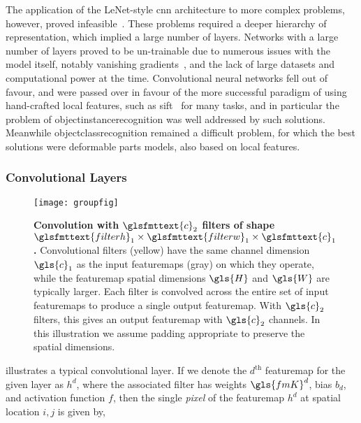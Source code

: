 \documentclass[thesis]{subfiles}
\begin{document}
The application of the LeNet-style \gls{cnn} architecture to more complex problems, however, proved infeasible~\citep{goodfellow2016deep}. These problems required a deeper hierarchy of representation, which implied a large number of layers. Networks with a large number of layers proved to be un-trainable due to numerous issues with the model itself, notably vanishing gradients~\citep{hochreiter1991untersuchungen}, and the lack of large datasets and computational power at the time. Convolutional neural networks fell out of favour, and were passed over in favour of the more successful paradigm of using hand-crafted local features, such as \gls{sift}~\citep{Lowe2004} for many tasks, and in particular the problem of \gls{objectinstancerecognition} was well addressed by such solutions. Meanwhile \gls{objectclassrecognition} remained a difficult problem, for which the best solutions were deformable parts models, also based on local features.

\subsubsection{Convolutional Layers}
\begin{figure}[tb]
	\centering
	\texttt{[image: groupfig]}
	\caption[Illustration of convolutional layer]{\textbf{Convolution with $\glsfmttext{c}_2$ filters of shape $\glsfmttext{filterh}_1\times \glsfmttext{filterw}_1\times \glsfmttext{c}_1$.} Convolutional filters (yellow) have the same channel dimension $\gls{c}_1$ as the input \glspl{featuremap} (gray) on which they operate, while the \gls{featuremap} spatial dimensions $\gls{H}$ and $\gls{W}$ are typically larger. Each filter is convolved across the entire set of input \glspl{featuremap} to produce a single output \gls{featuremap}. With $\gls{c}_2$ filters, this gives an output \gls{featuremap} with $\gls{c}_2$ channels. In this illustration we assume padding appropriate to preserve the spatial dimensions.}\label{fig:convlayer}
\end{figure}
%
 illustrates a typical convolutional layer. If we denote the $d^{\text{th}}$ \gls{featuremap} for the given layer as $h^d$, where the associated filter has weights $\gls{fmK}^d$, bias $b_d$, and activation function $f$, then the single \emph{pixel} of the \gls{featuremap} $h^d$ at spatial location $i, j$ is given by,
\end{document}
